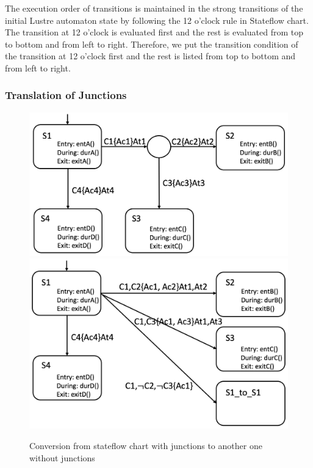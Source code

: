 \documentclass{article}
\begin{document}
The execution order of transitions is maintained in the strong transitions of the initial Lustre automaton state by following the 12 o'clock rule in Stateflow chart.
The transition at 12 o'clock is evaluated first and the rest is evaluated from top to bottom and from left to right. 
Therefore, we put the transition condition of the transition at 12 o'clock first and the rest is listed from top to bottom and from left to right. 

\subsubsection{Translation of Junctions}

\begin{figure}[h]
\begin{center}
  \includegraphics[scale=0.18]{figures/sf1} 
    \includegraphics[scale=0.15]{figures/sf2}    
\end{center}  
  \caption{Conversion from stateflow chart with junctions to another one without junctions}
  \label{sf1}
\end{figure}
\end{document}
